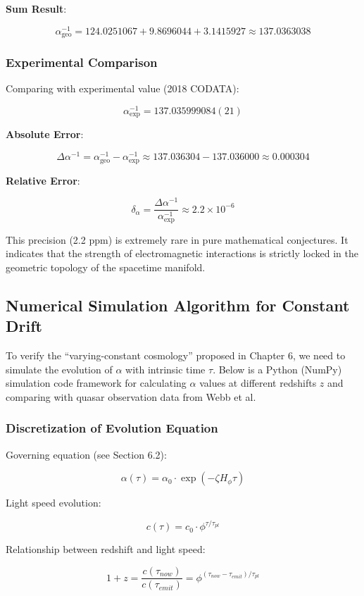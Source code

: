 \textbf{Sum Result}:

\[\alpha_{\text{geo}}^{-1} = 124.0251067 + 9.8696044 + 3.1415927 \approx 137.0363038\]

\subsubsection{Experimental Comparison}

Comparing with experimental value (2018 CODATA):

\[\alpha_{\text{exp}}^{-1} = 137.035999084(21)\]

\textbf{Absolute Error}:

\[\Delta \alpha^{-1} = \alpha_{\text{geo}}^{-1} - \alpha_{\text{exp}}^{-1} \approx 137.036304 - 137.036000 \approx 0.000304\]

\textbf{Relative Error}:

\[\delta_{\alpha} = \frac{\Delta \alpha^{-1}}{\alpha_{\text{exp}}^{-1}} \approx 2.2 \times 10^{-6}\]

This precision (2.2 ppm) is extremely rare in pure mathematical conjectures. It indicates that the strength of electromagnetic interactions is strictly locked in the geometric topology of the spacetime manifold.

\subsection{Numerical Simulation Algorithm for Constant Drift}

To verify the ``varying-constant cosmology'' proposed in Chapter 6, we need to simulate the evolution of $\alpha$ with intrinsic time $\tau$. Below is a Python (NumPy) simulation code framework for calculating $\alpha$ values at different redshifts $z$ and comparing with quasar observation data from Webb et al.

\subsubsection{Discretization of Evolution Equation}

Governing equation (see Section 6.2):

\[\alpha(\tau) = \alpha_0 \cdot \exp(-\zeta H_\phi \tau)\]

Light speed evolution:

\[c(\tau) = c_0 \cdot \phi^{\tau/\tau_{pl}}\]

Relationship between redshift and light speed:

\[1 + z = \frac{c(\tau_{now})}{c(\tau_{emit})} = \phi^{(\tau_{now} - \tau_{emit})/\tau_{pl}}\]


